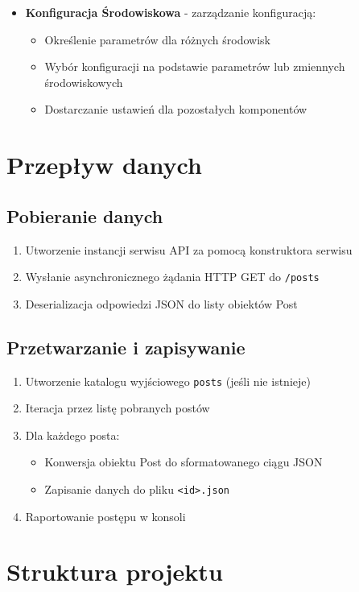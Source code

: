 \documentclass[12pt,a4paper]{article}
\begin{document}
\begin{itemize}
    \item \textbf{Konfiguracja Środowiskowa} - zarządzanie konfiguracją:
    \begin{itemize}
        \item Określenie parametrów dla różnych środowisk
        \item Wybór konfiguracji na podstawie parametrów lub zmiennych środowiskowych
        \item Dostarczanie ustawień dla pozostałych komponentów
    \end{itemize}
\end{itemize}

\section{Przepływ danych}

\subsection{Pobieranie danych}
\begin{enumerate}
    \item Utworzenie instancji serwisu API za pomocą konstruktora serwisu
    \item Wysłanie asynchronicznego żądania HTTP GET do \texttt{/posts}
    \item Deserializacja odpowiedzi JSON do listy obiektów Post
\end{enumerate}

\subsection{Przetwarzanie i zapisywanie}
\begin{enumerate}
    \item Utworzenie katalogu wyjściowego \texttt{posts} (jeśli nie istnieje)
    \item Iteracja przez listę pobranych postów
    \item Dla każdego posta:
    \begin{itemize}
        \item Konwersja obiektu Post do sformatowanego ciągu JSON
        \item Zapisanie danych do pliku \texttt{<id>.json}
    \end{itemize}
    \item Raportowanie postępu w konsoli
\end{enumerate}

\section{Struktura projektu}
\end{document}
